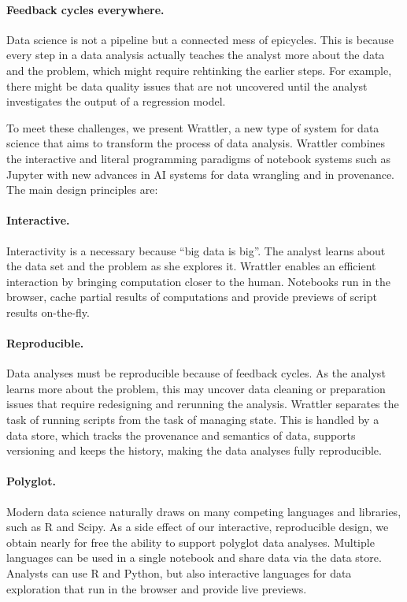 \documentclass[sigplan,preprint,10pt]{acmart}\settopmatter{printfolios=true,printccs=false,printacmref=false}
\theoremstyle{plain}
\theoremstyle{definition}
\begin{document}
\paragraph{Feedback cycles everywhere.} Data science is
not a pipeline but a connected mess of epicycles. This is because every step
in a data analysis actually teaches
the analyst more about the data and the problem, which might require rehtinking the earlier steps.
For example, there might be data quality issues that
are not uncovered until the analyst
investigates the output of a regression model.

\vspace{1em}
\noindent
To meet these challenges, we present Wrattler,
a new type of system for data science
that aims to transform the process
of data analysis.
Wrattler combines the interactive and literal programming paradigms
of notebook systems such as Jupyter
with new advances in AI systems for data wrangling and in provenance.
The main design principles are:

\paragraph{Interactive.} Interactivity
is a necessary because ``big data is big''. The analyst learns about
the data set and the problem as she explores it.
Wrattler enables an efficient interaction by bringing computation closer to the human.
Notebooks run in the browser, cache partial results of computations and provide previews
of script results on-the-fly.

\paragraph{Reproducible.}
Data analyses must be reproducible
because of feedback cycles. As the
analyst learns more about the problem,
this may uncover data cleaning or preparation issues that require
redesigning and rerunning the analysis.
Wrattler separates the task of running scripts from the task of managing state.
This is handled by a data store, which tracks the provenance and semantics of data, supports
versioning and keeps the history, making the data analyses fully reproducible.

\paragraph{Polyglot.}
Modern data science naturally draws
on many competing languages and libraries, such as R and Scipy. As a side effect
of our interactive, reproducible design,
we obtain nearly for free the ability
to support polyglot data analyses.
Multiple languages can be used in a single notebook and share data via the data store.
Analysts can use R and Python, but also interactive languages for data exploration
that run in the browser and provide live previews.
\end{document}
